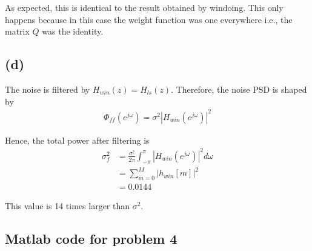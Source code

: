 \documentclass{article}
\begin{document}
As expected, this is identical to the result obtained by windoing. This only happens because in this case the weight function was one everywhere i.e., the matrix $Q$ was the identity.

\subsection{(d)}

The noise is filtered by $H_{win}(z) = H_{ls}(z)$. Therefore, the noise PSD is shaped by
\begin{align}
	\Phi_{ff}(e^{j\omega}) = \sigma^2|H_{win}(e^{j\omega})|^2
\end{align}

Hence, the total power after filtering is
\begin{align}
	\sigma_f^2 &= \frac{\sigma^2}{2\pi}\int_{-\pi}^{\pi}|H_{win}(e^{j\omega})|^2d\omega \\
	&= \sum_{m=0}^{M} |h_{win}[m]|^2 \\
	&= 0.0144
\end{align}

This value is 14 times larger than $\sigma^2$.

\subsection{Matlab code for problem 4}

\end{document}
